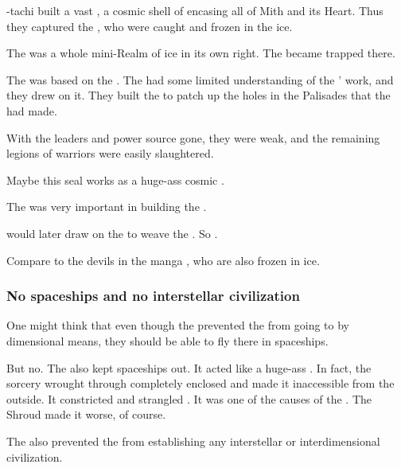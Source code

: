 \Sethicus-tachi built a vast \CrystalSphere, a cosmic shell of  encasing all of Mith and its Heart. 
Thus they captured the \banelords, who were caught and frozen in the ice. 

The \CrystalSphere{} was a whole mini-Realm of ice in its own right. 
The \banelords{} became trapped there. 

The \CrystalSphere was based on the . 
The \ophidians had some limited understanding of the \voyagers' work, and they drew on it.
They built the \CrystalSphere to patch up the holes in the Palisades that the \banes had made.

With the \pps{\banes}{} leaders and power source gone, they were weak, and the remaining legions of \bane{} warriors were easily slaughtered. 

Maybe this seal works as a huge-ass cosmic . 

The \xs{}  was very important in building the \CrystalSphere. 

\Daggerrain{} would later draw on the \CrystalSphere{} to weave the . 
So . 

Compare to the devils in the manga \cite{NagaiGo:Devilman}, who are also frozen in ice. 





\subsubsection{No spaceships and no interstellar civilization}
One might think that even though the \CrystalSphere{} prevented the \banelords{} from going to \Miith{} by dimensional means, they should be able to fly there in spaceships. 

But no. 
The \CrystalSphere{} also kept spaceships out. 
It acted like a huge-ass . 
In fact, the sorcery wrought through \NaathKurRamalech{} completely enclosed \Miith{} and made it inaccessible from the outside. 
It constricted and strangled \Miith{}. 
It was one of the causes of the . 
The Shroud made it worse, of course. 

The \CrystalSphere also prevented the \Miithians from establishing any interstellar or interdimensional civilization.

